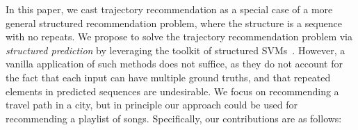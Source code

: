 In this paper, we cast trajectory recommendation as a special case of a more general
structured recommendation problem, where the structure is a sequence with no repeats.
We propose to solve the trajectory recommendation problem
via \emph{structured prediction} by leveraging the toolkit of structured
SVMs~\citep{taskar2004max,tsochantaridis2004support}.
However, a vanilla application of such methods does not suffice,
as they do not account for the fact that each input can have multiple ground truths,
and that 
repeated elements in predicted sequences are undesirable.
We focus %
on recommending a travel path in a city, but in principle our approach could be
used for recommending a playlist of songs.
Specifically, our contributions are as follows:

